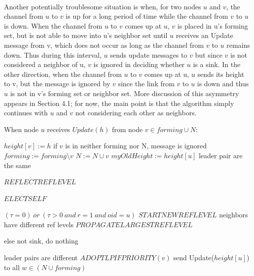 \paragraph{}Another potentially troublesome situation is when, for two nodes $u$ and $v$, the channel from $u$ to $v$ is up for a long period of time while the channel from $v$ to $u$ is down. When the channel from $u$ to $v$ comes up at $u$, $v$ is placed in u’s forming set, but is not able to move into u’s neighbor set until $u$ receives an Update message from v, which does not occur as long as the channel from $v$ to $u$ remains down. Thus during this interval, $u$ sends update messages to $v$ but since $v$ is not considered a neighbor of u, $v$ is ignored in deciding whether $u$ is a sink. In the other direction, when the channel from $u$ to $v$ comes up at u, $u$ sends its height to v, but the message is ignored by $v$ since the link from $v$ to $u$ is down and thus $u$ is not in v’s forming set or neighbor set. More discussion of this asymmetry appears in Section 4.1; for now, the main point is that the algorithm simply continues with $u$ and $v$ not considering each other as neighbors.

\begin{algorithm}
	\caption{When node $u$ receives $Update(h)$ from node $v \in forming \cup N$:}
\begin{algorithmic}[1]
	
	\State $height[v] := h$ \Comment if $v$ is in neither forming nor N, message is ignored
	\State $forming := forming \setminus {v}$
	\State $N := N \cup {v}$
	\State $myOldHeight := height[u]$
	 \Comment leader pair are the same
	
	
		\State $REFLECTREFLEVEL$
	
		\State $ELECTSELF$
		
		\Else \Comment $(\tau = 0)~or~(\tau > 0~and~r = 1~and~oid = u)$
		\State $STARTNEWREFLEVEL$
		\EndIf
	\Else \Comment neighbors have different ref levels
	\State $PROPAGATELARGESTREFLEVEL$
	
	\EndIf 
	
	\EndIf \Comment else not sink, do nothing
	
	\Else \Comment leader pairs are different
	\State $ADOPTLPIFPRIORITY(v)$	
	\EndIf
	\State send Update($height[u]$) to all $w \in (N \cup forming)$
	\EndIf
	
\end{algorithmic}

\end{algorithm}

